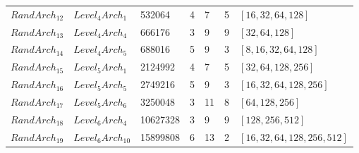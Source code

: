 \documentclass[preprint,12pt]{elsarticle}
\begin{document}
\begin{footnotesize}
\begin{longtable}{p{3.0cm}p{2.0cm}p{1.8cm}p{1.7cm}p{1.3cm}p{1.4cm}p{2.2cm}}
$RandArch_{12}$  & $Level_4Arch_1$     & 532064   & 4 & 7  & 5 & $[16, 32, 64, 128]$ \\
$RandArch_{13}$  & $Level_4Arch_4$     & 666176   & 3 & 9  & 9 & $[32, 64, 128]$ \\
$RandArch_{14}$  & $Level_4Arch_5$     & 688016   & 5 & 9  & 3 & $[8, 16, 32, 64, 128]$ \\

$RandArch_{15}$  & $Level_5Arch_1$     & 2124992  & 4 & 7  & 5 & $[32, 64, 128, 256]$ \\
$RandArch_{16}$  & $Level_5Arch_5$     & 2749216  & 5 & 9  & 3 & $[16, 32, 64, 128, 256]$ \\
$RandArch_{17}$  & $Level_5Arch_6$     & 3250048  & 3 & 11 & 8 & $[64, 128, 256]$ \\

$RandArch_{18}$  & $Level_6Arch_4$     & 10627328 & 3 & 9  & 9 & $[128, 256, 512]$ \\
$RandArch_{19}$  & $Level_6Arch_{10}$  & 15899808 & 6 & 13 & 2 & $[16, 32, 64, 128, 256, 512]$ \\

\end{longtable}
\end{footnotesize}


\clearpage
  
 
\end{document}
